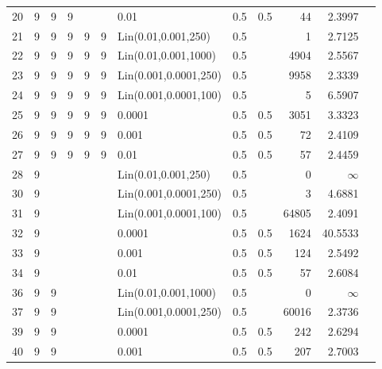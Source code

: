 \begin{longtable}{lrrrrrlrrrrr}
   20 &       9 & 9 & 9 &   &   &                  0.01 &  0.5 &    0.5 &      44 &                 2.3997 \\
   21 &       9 & 9 & 9 & 9 & 9 &   Lin(0.01,0.001,250) &  0.5 &        &       1 &                 2.7125 \\
   22 &       9 & 9 & 9 & 9 & 9 &  Lin(0.01,0.001,1000) &  0.5 &        &    4904 &                 2.5567 \\
   23 &       9 & 9 & 9 & 9 & 9 & Lin(0.001,0.0001,250) &  0.5 &        &    9958 &                 2.3339 \\
   24 &       9 & 9 & 9 & 9 & 9 & Lin(0.001,0.0001,100) &  0.5 &        &       5 &                 6.5907 \\
   25 &       9 & 9 & 9 & 9 & 9 &                0.0001 &  0.5 &    0.5 &    3051 &                 3.3323 \\
   26 &       9 & 9 & 9 & 9 & 9 &                 0.001 &  0.5 &    0.5 &      72 &                 2.4109 \\
   27 &       9 & 9 & 9 & 9 & 9 &                  0.01 &  0.5 &    0.5 &      57 &                 2.4459 \\
   28 &       9 &   &   &   &   &   Lin(0.01,0.001,250) &  0.5 &        &       0 &               $\infty$ \\
   30 &       9 &   &   &   &   & Lin(0.001,0.0001,250) &  0.5 &        &       3 &                 4.6881 \\
   31 &       9 &   &   &   &   & Lin(0.001,0.0001,100) &  0.5 &        &   64805 &                 2.4091 \\
   32 &       9 &   &   &   &   &                0.0001 &  0.5 &    0.5 &    1624 &                40.5533 \\
   33 &       9 &   &   &   &   &                 0.001 &  0.5 &    0.5 &     124 &                 2.5492 \\
   34 &       9 &   &   &   &   &                  0.01 &  0.5 &    0.5 &      57 &                 2.6084 \\
   36 &       9 & 9 &   &   &   &  Lin(0.01,0.001,1000) &  0.5 &        &       0 &               $\infty$ \\
   37 &       9 & 9 &   &   &   & Lin(0.001,0.0001,250) &  0.5 &        &   60016 &                 2.3736 \\
   39 &       9 & 9 &   &   &   &                0.0001 &  0.5 &    0.5 &     242 &                 2.6294 \\
   40 &       9 & 9 &   &   &   &                 0.001 &  0.5 &    0.5 &     207 &                 2.7003 \\

\end{longtable}

